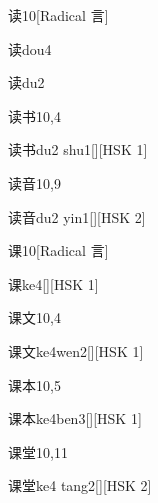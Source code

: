 \begin{entry}{读}{10}[Radical 言]
  \begin{phonetics}{读}{dou4}
  \end{phonetics}
  \begin{phonetics}{读}{du2}
  \end{phonetics}
\end{entry}

\begin{entry}{读书}{10,4}
  \begin{phonetics}{读书}{du2 shu1}[][HSK 1]
  \end{phonetics}
\end{entry}

\begin{entry}{读音}{10,9}
  \begin{phonetics}{读音}{du2 yin1}[][HSK 2]
  \end{phonetics}
\end{entry}

\begin{entry}{课}{10}[Radical 言]
  \begin{phonetics}{课}{ke4}[][HSK 1]
  \end{phonetics}
\end{entry}

\begin{entry}{课文}{10,4}
  \begin{phonetics}{课文}{ke4wen2}[][HSK 1]
  \end{phonetics}
\end{entry}

\begin{entry}{课本}{10,5}
  \begin{phonetics}{课本}{ke4ben3}[][HSK 1]
  \end{phonetics}
\end{entry}

\begin{entry}{课堂}{10,11}
  \begin{phonetics}{课堂}{ke4 tang2}[][HSK 2]
  \end{phonetics}
\end{entry}

